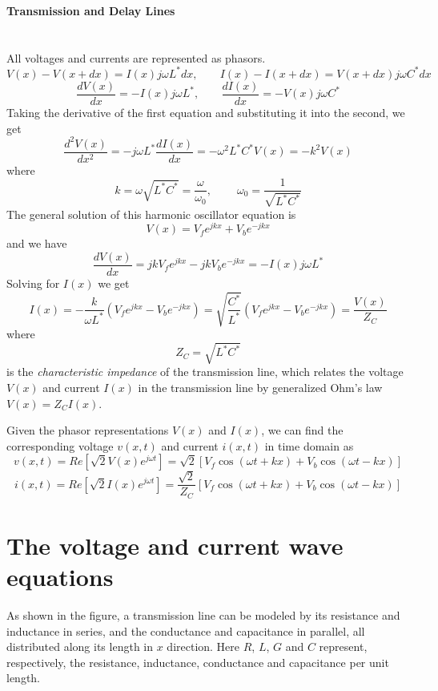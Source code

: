 \usepackage{html}


{\huge \bf Transmission and Delay Lines}


\section*{}

All voltages and currents are represented as phasors.
\[ V(x)-V(x+dx)=I(x)j\omega L^* dx,\;\;\;\;\;\;\;I(x)-I(x+dx)=V(x+dx)j\omega C^* dx \]
\[ \frac{dV(x)}{dx}=-I(x)j\omega L^*,\;\;\;\;\;\;\;\frac{dI(x)}{dx}=-V(x)j\omega C^* \]
Taking the derivative of the first equation and substituting it into the second, we get
\[ \frac{d^2V(x)}{dx^2}=-j\omega L^*\frac{dI(x)}{dx}=-\omega^2L^*C^* V(x)=-k^2V(x) \]
where
\[ k=\omega\sqrt{L^*C^*}=\frac{\omega}{\omega_0},
\;\;\;\;\;\;\;\;\omega_0=\frac{1}{\sqrt{L^*C^*}} \]
The general solution of this harmonic oscillator equation is
\[ V(x)=V_fe^{jkx}+V_be^{-jkx} \]
and we have
\[ \frac{dV(x)}{dx}=jk V_fe^{jkx}-jk V_b e^{-jkx}=-I(x)j\omega L^*  \]
Solving for $I(x)$ we get
\[ I(x)=-\frac{k}{\omega L^*}(V_fe^{jkx}-V_b e^{-jkx})
=\sqrt{\frac{C^*}{L^*}} (V_fe^{jkx}-V_b e^{-jkx})=\frac{V(x)}{Z_C} \]
where
\[ Z_C=\sqrt{{L^*}{C^*}} \]
is the {\em characteristic impedance} of the transmission line, which relates the 
voltage $V(x)$ and current $I(x)$ in the transmission line by generalized Ohm's 
law $V(x)=Z_C I(x)$.

Given the phasor representations $V(x)$ and $I(x)$, we can find the corresponding
voltage $v(x,t)$ and current $i(x,t)$ in time domain as
\[ v(x,t)=Re[\sqrt{2} V(x) e^{j\omega t}]=\sqrt{2}[V_f\cos(\omega t+kx)+V_b\cos(\omega t-kx)] \]
\[ i(x,t)=Re[\sqrt{2} I(x) e^{j\omega t}]=\frac{\sqrt{2}}{Z_C}[V_f\cos(\omega t+kx)+V_b\cos(\omega t-kx)] \]



\section*{The voltage and current wave equations}

As shown in the figure, a transmission line can be modeled by its 
resistance and inductance in series, and the conductance and capacitance
in parallel, all distributed along its length in $x$ direction. Here $R$,
$L$, $G$ and $C$ represent, respectively, the resistance, inductance, 
conductance and capacitance per unit length.


